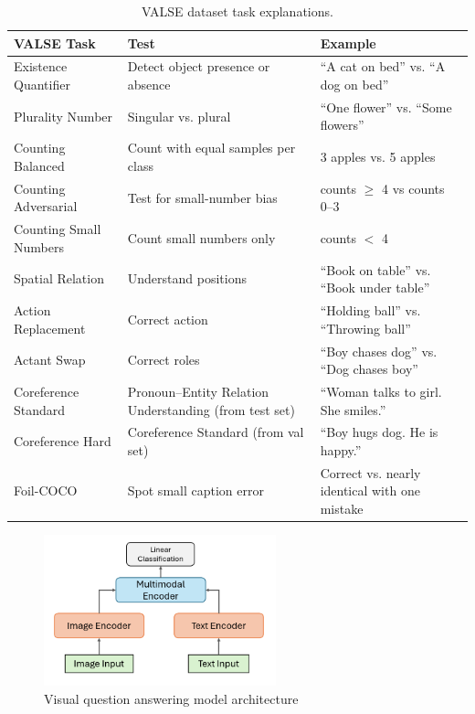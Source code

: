 \begin{table}[h]
    \caption{VALSE dataset task explanations.}
    \label{tab:valse_detail}
    \centering
    \begin{tabular}{|l|p{4cm}|p{5cm}|}
        \hline
        \textbf{VALSE Task} & \textbf{Test} & \textbf{Example} \\ \hline
        Existence Quantifier & Detect object presence or absence & ``A cat on bed'' vs. ``A dog on bed'' \\ \hline
        Plurality Number & Singular vs. plural & ``One flower'' vs. ``Some flowers'' \\ \hline
        Counting Balanced & Count with equal samples per class & 3 apples vs. 5 apples \\ \hline
        Counting Adversarial & Test for small-number bias & counts $\ge$ 4 vs counts 0–3 \\ \hline
        Counting Small Numbers & Count small numbers only & counts $<$ 4 \\ \hline
        Spatial Relation & Understand positions & ``Book on table'' vs. ``Book under table'' \\ \hline
        Action Replacement & Correct action & ``Holding ball'' vs. ``Throwing ball'' \\ \hline
        Actant Swap & Correct roles & ``Boy chases dog'' vs. ``Dog chases boy'' \\ \hline
        Coreference Standard & Pronoun–Entity Relation Understanding (from test set) & ``Woman talks to girl. She smiles.'' \\ \hline
        Coreference Hard & Coreference Standard (from val set) & ``Boy hugs dog. He is happy.'' \\ \hline
        Foil-COCO & Spot small caption error & Correct vs. nearly identical with one mistake \\ \hline
    \end{tabular}
\end{table}

\begin{figure}[h]
    \centering
    \includegraphics[width=0.6\textwidth]{Images/vqa_method.png}
    \small
    \caption{Visual question answering model architecture}
    \label{fig:vqa}
\end{figure}

